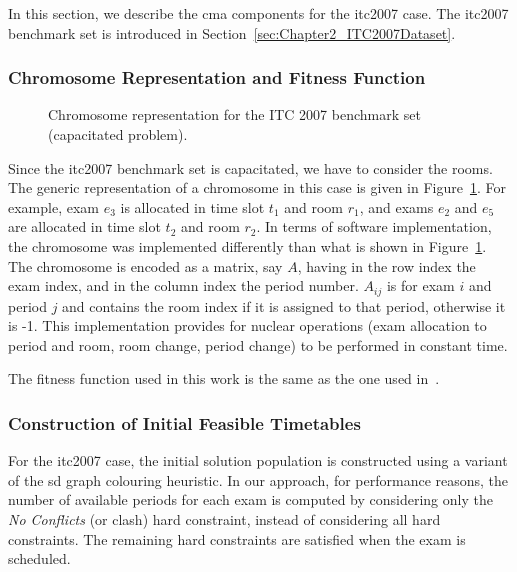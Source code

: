 In this section, we describe the \gls{cma} components for the \gls{itc2007} case. The \gls{itc2007} benchmark set is introduced in Section~\ref{sec:Chapter2_ITC2007Dataset}.


\subsubsection{Chromosome Representation and Fitness Function}
\label{sec:Chapter6_ChromosomeRepresentation}


\begin{figure}[!ht]
	\centering
	\caption{Chromosome representation for the ITC 2007 benchmark set (capacitated problem).}
	\label{fig:EncodingSchemeITC2007} 
\end{figure}


Since the \gls{itc2007} benchmark set is capacitated, we have to consider the rooms. The generic representation of a chromosome in this case is given in Figure~\ref{fig:EncodingSchemeITC2007}. For example, exam $e_{3}$ is allocated in time slot $t_1$ and room $r_{1}$, and exams $e_{2}$ and $e_{5}$ are allocated in time slot $t_2$ and room $r_{2}$. In terms of software implementation, the chromosome was implemented differently than what is shown in Figure~\ref{fig:EncodingSchemeITC2007}. The chromosome is encoded as a matrix, say $A$, having in the row index the exam index, and in the column index the period number. $A_{ij}$ is for exam $i$ and period $j$ and contains the room index if it is assigned to that period, otherwise it is -1. This implementation provides for nuclear operations (exam allocation to period and room, room change, period change) to be performed in constant time.

The fitness function used in this work is the same as the one used in~\cite{McCollum2012}.


\subsubsection{Construction of Initial Feasible Timetables}

For the \gls{itc2007} case, the initial solution population is constructed using a variant of the \gls{sd} graph colouring heuristic. In our approach, for performance reasons, the number of available periods for each exam is computed by considering only the \textit{No Conflicts} (or clash) hard constraint, instead of considering all hard constraints. The remaining hard constraints are satisfied when the exam is scheduled.


